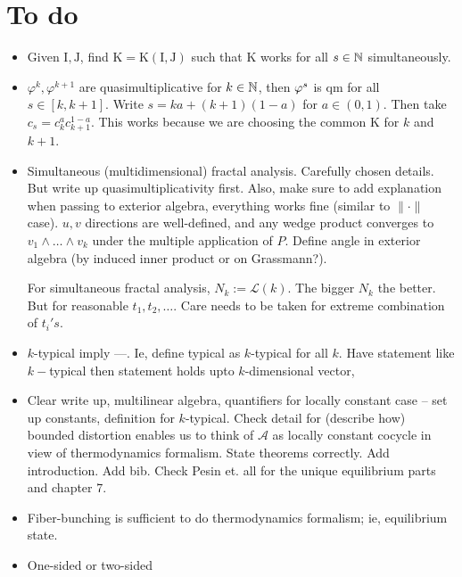 \documentclass[11pt,oneside,reqno]{amsart}
\numberwithin{equation}{section}
\numberwithin{figure}{section}
\theoremstyle{definition}
\theoremstyle{definition}
\theoremstyle{definition}
\theoremstyle{definition}
\theoremstyle{remark}
\theoremstyle{definition}
\theoremstyle{definition}
\theoremstyle{definition}
\def\A{\mathcal{A}}
\def\L{\mathcal{L}}
\def\I{\mathrm{I}}
\def\J{\mathrm{J}}
\def\K{\mathrm{K}}
\def\vps{\vphi^s}
\begin{document}
\section{To do}
\begin{itemize}
\item Given $\I,\J$, find $\K = \K(\I,\J)$ such that $\K$ works for all $s \in \mathbb{N}$ simultaneously. 
\item $\varphi^k,\varphi^{k+1}$ are quasimultiplicative for $k \in \mathbb{N}$, then $\vps$ is qm for all $s \in [k,k+1]$.
Write $s = ka+(k+1)(1-a)$ for $a \in (0,1)$. Then take $c_s = c_k^{a}c_{k+1}^{1-a}$. This works because we are choosing the common $\K$ for $k$ and $k+1$.
\item  
Simultaneous (multidimensional) fractal analysis. Carefully chosen details. But write up quasimultiplicativity first. Also, make sure to add explanation when passing to exterior algebra, everything works fine (similar to $\|\cdot\|$ case). $u,v$ directions are well-defined, and any wedge product converges to $v_1 \wedge \ldots \wedge v_k$ under the multiple application of $P$. Define angle in exterior algebra (by induced inner product or on Grassmann?).

For simultaneous fractal analysis, $N_k:=\L(k)$. The bigger $N_k$ the better.  But for reasonable $t_1,t_2,\ldots.$ Care needs to be taken for extreme combination of $t_i's$. 

\item $k$-typical imply ---. Ie, define typical as $k$-typical for all $k$. Have statement like $k-$typical then statement holds upto $k$-dimensional vector, 
\item Clear write up, multilinear algebra, quantifiers for locally constant case -- set up constants, definition for $k$-typical. Check detail for (describe how) bounded distortion enables us to think of $\A$ as locally constant cocycle in view of thermodynamics formalism. State theorems correctly. Add introduction. Add bib. Check Pesin et. all for the unique equilibrium parts and chapter 7.
\item Fiber-bunching is sufficient to do thermodynamics formalism; ie, equilibrium state.
\item One-sided or two-sided
\end{itemize}
\end{document}
